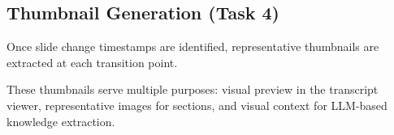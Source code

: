 \subsection{Thumbnail Generation (Task 4)}

Once slide change timestamps are identified, representative thumbnails are extracted at each transition point.

These thumbnails serve multiple purposes: visual preview in the transcript viewer, representative images for sections, and visual context for LLM-based knowledge extraction.
